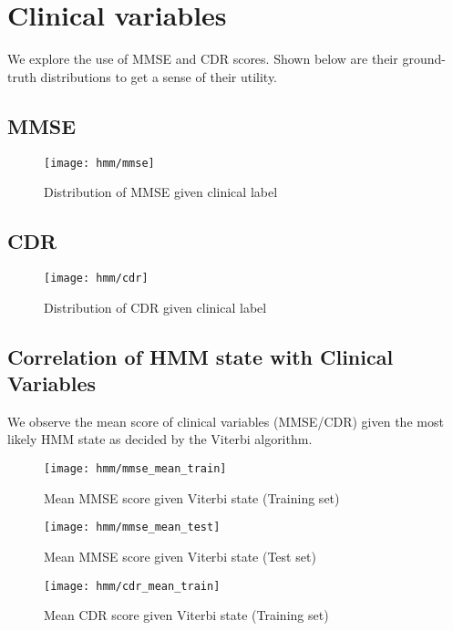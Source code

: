 \documentclass[12pt,a4paper]{article}
\begin{document}
\section{Clinical variables}
\label{sec:clin-var}

We explore the use of MMSE and CDR scores. Shown below are their
ground-truth distributions to get a sense of their utility.

\subsection{MMSE}
\label{sec:mmse}

\begin{figure}[H]
  \centering
  \texttt{[image: hmm/mmse]}
  \caption{Distribution of MMSE given clinical label}  
\end{figure}

\subsection{CDR}
\label{sec:cdr}

\begin{figure}[H]
  \centering
  \texttt{[image: hmm/cdr]}
  \caption{Distribution of CDR given clinical label}  
\end{figure}

\subsection{Correlation of HMM state with Clinical Variables}
\label{sec:hmm-stat-correl-clinvar}

We observe the mean score of clinical variables (MMSE/CDR) given the
most likely HMM state as decided by the Viterbi algorithm.

\begin{figure}[H]
  \centering
  \texttt{[image: hmm/mmse\_mean\_train]}
  \caption{Mean MMSE score given Viterbi state (Training set)}  
\end{figure}

\begin{figure}[H]
  \centering
  \texttt{[image: hmm/mmse\_mean\_test]}
  \caption{Mean MMSE score given Viterbi state (Test set)}  
\end{figure}

\begin{figure}[H]
  \centering
  \texttt{[image: hmm/cdr\_mean\_train]}
  \caption{Mean CDR score given Viterbi state (Training set)}  
\end{figure}
\end{document}
